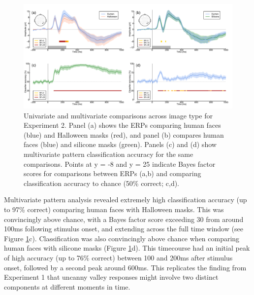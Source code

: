 \documentclass[
]{article}
\begin{document}
\begin{figure}

{\centering \includegraphics{Figures/MasksMVPA} 

}

\caption{Univariate and multivariate comparisons across image type for Experiment 2. Panel (a) shows the ERPs comparing human faces (blue) and Halloween masks (red), and panel (b) compares human faces (blue) and silicone masks (green). Panels (c) and (d) show multivariate pattern classification accuracy for the same comparisons. Points at y = -8 and y = 25 indicate Bayes factor scores for comparisons between ERPs (a,b) and comparing classification accuracy to chance (50\% correct; c,d).}\label{fig:MasksMVPA}
\end{figure}

Multivariate pattern analysis revealed extremely high classification accuracy (up to 97\% correct) comparing human faces with Halloween masks. This was convincingly above chance, with a Bayes factor score exceeding 30 from around 100ms following stimulus onset, and extending across the full time window (see Figure \ref{fig:MasksMVPA}c). Classification was also convincingly above chance when comparing human faces with silicone masks (Figure \ref{fig:MasksMVPA}d). This timecourse had an initial peak of high accuracy (up to 76\% correct) between 100 and 200ms after stimulus onset, followed by a second peak around 600ms. This replicates the finding from Experiment 1 that uncanny valley responses might involve two distinct components at different moments in time.
\end{document}
